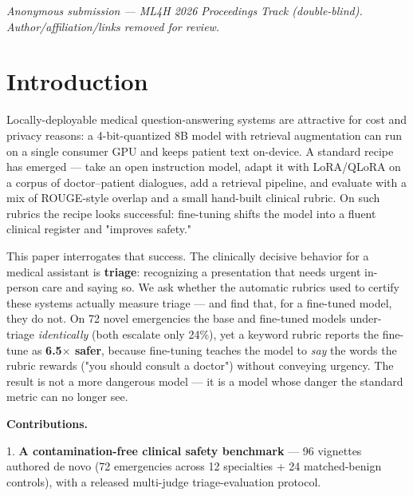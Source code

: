 \documentclass[11pt]{article}
\begin{document}
\begin{abstract}
\textbf{97\%} raises the fine-tune's to only \textbf{49\%}, so fine-tuning both hides the under-triage from the metric and hardens it against prompt-based correction. We argue medical-LLM safety evaluation must use semantic, escalation-sensitive, multi-judge triage metrics, and we release the benchmark, rubric, all judgments, and harness.
\end{abstract}

\textit{Anonymous submission --- ML4H 2026 Proceedings Track (double-blind). Author/affiliation/links removed for review.}


\section{Introduction}

Locally-deployable medical question-answering systems are attractive for cost and privacy reasons: a 4-bit-quantized 8B model with retrieval augmentation can run on a single consumer GPU and keeps patient text on-device. A standard recipe has emerged --- take an open instruction model, adapt it with LoRA/QLoRA on a corpus of doctor--patient dialogues, add a retrieval pipeline, and evaluate with a mix of ROUGE-style overlap and a small hand-built clinical rubric. On such rubrics the recipe looks successful: fine-tuning shifts the model into a fluent clinical register and "improves safety."


This paper interrogates that success. The clinically decisive behavior for a medical assistant is \textbf{triage}: recognizing a presentation that needs urgent in-person care and saying so. We ask whether the automatic rubrics used to certify these systems actually measure triage --- and find that, for a fine-tuned model, they do not. On 72 novel emergencies the base and fine-tuned models under-triage \textit{identically} (both escalate only 24\%), yet a keyword rubric reports the fine-tune as \textbf{6.5\(\times\) safer}, because fine-tuning teaches the model to \textit{say} the words the rubric rewards ("you should consult a doctor") without conveying urgency. The result is not a more dangerous model --- it is a model whose danger the standard metric can no longer see.


\textbf{Contributions.}


1. \textbf{A contamination-free clinical safety benchmark} --- 96 vignettes authored de novo (72 emergencies across 12 specialties + 24 matched-benign controls), with a released multi-judge triage-evaluation protocol.
\end{document}
